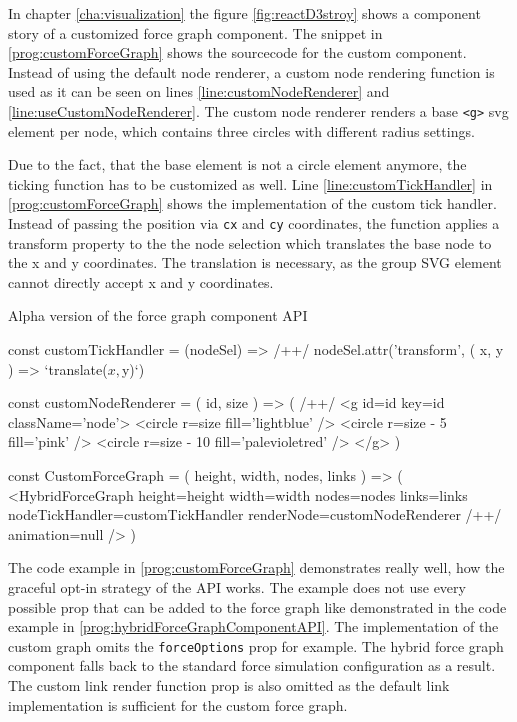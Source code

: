 In chapter \ref{cha:visualization} the figure \ref{fig:reactD3stroy} shows a component story of a customized force graph component. The snippet in \ref{prog:customForceGraph} shows the sourcecode for the custom component. Instead of using the default node renderer, a custom node rendering function is used as it can be seen on lines \ref{line:customNodeRenderer} and \ref{line:useCustomNodeRenderer}. The custom node renderer renders a base \texttt{<g>} svg element per node, which contains three circles with different radius settings. 

Due to the fact, that the base element is not a circle element anymore, the ticking function has to be customized as well. Line \ref{line:customTickHandler} in \ref{prog:customForceGraph} shows the implementation of the custom tick handler. Instead of passing the position via \texttt{cx} and \texttt{cy} coordinates, the function applies a transform property to the the node selection which translates the base node to the x and y coordinates. The translation is necessary, as the group SVG element cannot directly accept x and y coordinates.

\begin{program}
\caption{Alpha version of the force graph component API}
\label{prog:customForceGraph}
\begin{JsCode}
const customTickHandler = (nodeSel) => /+\label{line:customTickHandler}+/ 
  nodeSel.attr('transform', ({ x, y }) => `translate(${x},${y})`)

const customNodeRenderer = ({ id, size }) => ( /+\label{line:customNodeRenderer}+/ 
  <g id={id} key={id} className={'node'}>
    <circle r={size} fill={'lightblue'} />
    <circle r={size - 5} fill={'pink'} />
    <circle r={size - 10} fill={'palevioletred'} />
  </g>
)

const CustomForceGraph = ({ height, width, nodes, links }) => (
  <HybridForceGraph
    height={height}
    width={width}
    nodes={nodes}
    links={links}
    nodeTickHandler={customTickHandler}
    renderNode={customNodeRenderer} /+\label{line:useCustomNodeRenderer}+/ 
    animation={null}
  />
)
\end{JsCode}
\end{program}

The code example in \ref{prog:customForceGraph} demonstrates really well, how the graceful opt-in strategy of the API works. The example does not use every possible prop that can be added to the force graph like demonstrated in the code example in \ref{prog:hybridForceGraphComponentAPI}. The implementation of the custom graph omits the \texttt{forceOptions} prop for example. The hybrid force graph component falls back to the standard force simulation configuration as a result. The custom link render function prop is also omitted as the default link implementation is sufficient for the custom force graph.